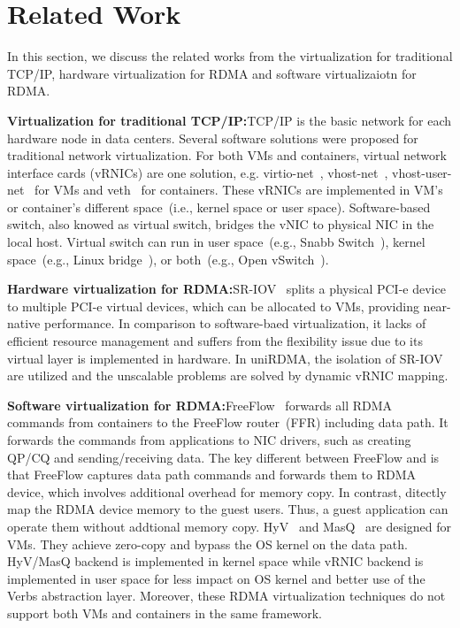 \section{Related Work} \label{relatedwork}

In this section, we discuss the related works from the virtualization for traditional TCP/IP, hardware virtualization for RDMA and software virtualizaiotn for RDMA.

\textbf{Virtualization for traditional TCP/IP:}\quad TCP/IP is the basic network for each hardware node in data centers. Several software solutions were proposed for traditional network virtualization. For both VMs and containers, virtual network interface cards (vRNICs) are one solution, e.g. virtio-net~\cite{virtio-russell2008}, vhost-net~\cite{vhost-net},  vhost-user-net~\cite{vhost-user-net} for VMs and veth~\cite{veth} for containers. These vRNICs are implemented in VM's or container's different space~(i.e., kernel space or user space). Software-based switch, also knowed as virtual switch, bridges the vNIC to physical NIC in the local host. Virtual switch can run in user space~(e.g., Snabb Switch~\cite{snabb}), kernel space~(e.g., Linux bridge~\cite{linux-bridge}), or both~(e.g., Open vSwitch~\cite{ovs-2015}). 

\textbf{Hardware virtualization for RDMA:}\quad SR-IOV~\cite{sr-iov} splits a physical PCI-e device to multiple PCI-e virtual devices, which can be allocated to VMs, providing near-native performance. In comparison to software-baed virtualization, it lacks of efficient resource management and suffers from the flexibility issue due to its virtual layer is implemented in hardware. In uniRDMA, the isolation of SR-IOV are utilized and the unscalable problems are solved by dynamic vRNIC mapping. 

\textbf{Software virtualization for RDMA:}\qquad FreeFlow~\cite{kim2019freeflow} forwards all RDMA commands from containers to the FreeFlow router~(FFR) including data path. It forwards the commands from applications to NIC drivers, such as creating QP/CQ and sending/receiving data. The key different between FreeFlow and \sys is that FreeFlow captures data path commands and forwards them to RDMA device, which involves additional overhead for memory copy. In contrast, \sys ditectly map the RDMA device memory to the guest users. Thus, a guest application can operate them without addtional memory copy. HyV~\cite{pfefferle2015hybrid} and MasQ~\cite{he2020masq} are designed for VMs. They achieve zero-copy and bypass the OS kernel on the data path. HyV/MasQ backend is implemented in kernel space while \sys vRNIC backend is implemented in user space for less impact on OS kernel and better use of the Verbs abstraction layer. Moreover, these RDMA virtualization techniques do not support both VMs and containers in the same framework.
